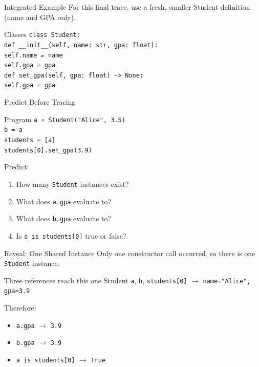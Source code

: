 \documentclass[aspectratio=169,10pt]{beamer}
\begin{document}
\begin{frame}{Integrated Example}
  For this final trace, use a fresh, smaller Student definition (name and GPA only).
  \begin{block}{Classes}
    \texttt{class Student:}\\
    \hspace*{0.20in}\texttt{def \_\_init\_\_(self, name: str, gpa: float):}\\
    \hspace*{0.40in}\texttt{self.name = name}\\
    \hspace*{0.40in}\texttt{self.gpa = gpa}\\
    \hspace*{0.20in}\texttt{def set\_gpa(self, gpa: float) -> None:}\\
    \hspace*{0.40in}\texttt{self.gpa = gpa}
  \end{block}
\end{frame}

\begin{frame}{Predict Before Tracing}
  \begin{block}{Program}
    \texttt{a = Student("Alice", 3.5)}\\
    \texttt{b = a}\\
    \texttt{students = [a]}\\
    \texttt{students[0].set\_gpa(3.9)}
  \end{block}

  Predict:
  \begin{enumerate}
    \item How many \texttt{Student} instances exist?
    \item What does \texttt{a.gpa} evaluate to?
    \item What does \texttt{b.gpa} evaluate to?
    \item Is \texttt{a is students[0]} true or false?
  \end{enumerate}
\end{frame}

\begin{frame}{Reveal: One Shared Instance}
  Only one constructor call occurred, so there is one \texttt{Student} instance.

  \begin{block}{Three references reach this one Student}
    \centering
    \texttt{a}, \texttt{b}, \texttt{students[0]}
    $\longrightarrow$ \texttt{name="Alice", gpa=3.9}
  \end{block}

  Therefore:
  \begin{itemize}
    \item \texttt{a.gpa} $\rightarrow$ \texttt{3.9}
    \item \texttt{b.gpa} $\rightarrow$ \texttt{3.9}
    \item \texttt{a is students[0]} $\rightarrow$ \texttt{True}
  \end{itemize}
\end{frame}
\end{document}
